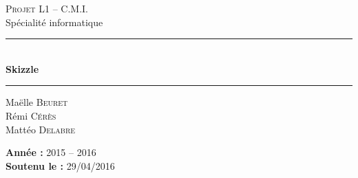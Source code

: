 \documentclass{report}
\begin{document}
\begin{titlepage}
    \centering

    \textsc{\LARGE Projet L1 -- C.M.I.}\\
    \vspace{.25cm}
    {\Large Spécialité informatique}
    \vspace{3cm}

    \rule{\linewidth}{0.5mm}\\
    \vspace{.4cm}
    {\huge\bfseries Skizzle}\\
    \vspace{.2cm}
    \rule{\linewidth}{0.5mm}
    \vspace{2cm}

    \begin{minipage}{0.495\textwidth}
        \begin{flushleft}\large
            Maëlle \textsc{Beuret}\\
            Rémi \textsc{Cérès}\\
            Mattéo \textsc{Delabre}
        \end{flushleft}
    \end{minipage}
    \begin{minipage}{0.495\textwidth}
        \begin{flushright}\large
            \textbf{Année :} 2015 -- 2016\\
            \textbf{Soutenu le :} 29/04/2016
        \end{flushright}
    \end{minipage}

    \vfill

    \newcommand{\logo}[2]{
        \raisebox{-.5\height}{
            \texttt{[image: \#1]}
        }
    }

    \logo{figures/frontpage-logo-um.png}{0.5}
    \logo{figures/frontpage-logo-fds.png}{0.25}
    \logo{figures/frontpage-logo-cgi.png}{0.05}
    \logo{figures/frontpage-logo-figure.png}{1}
\end{titlepage}

\setcounter{tocdepth}{1}
\tableofcontents

\setlength{\parskip}{0.4cm plus4mm minus3mm}








\cleardoublepage
{}
{}


\end{document}
